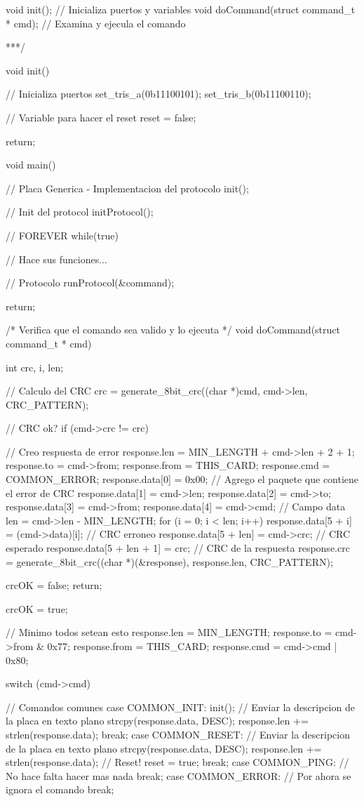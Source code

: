 \documentclass[a4paper,10pt]{article}
\begin{document}
{\begin{verbatimtab}
void init(); // Inicializa puertos y variables
void doCommand(struct command_t * cmd); // Examina y ejecula el comando

***/

void init()
{
	// Inicializa puertos
	set_tris_a(0b11100101);
	set_tris_b(0b11100110);

	// Variable para hacer el reset
	reset = false;

	return;	
}	

void main()
{
	// Placa Generica - Implementacion del protocolo
	init();

	// Init del protocol
	initProtocol();

	// FOREVER
	while(true)
	{
		// Hace sus funciones...

		// Protocolo
		runProtocol(&command);
	}

	return;
}

/* Verifica que el comando sea valido y lo ejecuta */
void doCommand(struct command_t * cmd)
{
	int crc, i, len;
		
	// Calculo del CRC
	crc = generate_8bit_crc((char *)cmd, cmd->len, CRC_PATTERN);
	
	// CRC ok?
	if (cmd->crc != crc)
	{		
		// Creo respuesta de error
		response.len = MIN_LENGTH + cmd->len + 2 + 1;
		response.to = cmd->from;
		response.from = THIS_CARD;
		response.cmd = COMMON_ERROR;
		response.data[0] = 0x00;
		// Agrego el paquete que contiene el error de CRC
		response.data[1] = cmd->len;
		response.data[2] = cmd->to;
		response.data[3] = cmd->from;
		response.data[4] = cmd->cmd;
		// Campo data
		len = cmd->len - MIN_LENGTH;
		for (i = 0; i < len; i++)
			response.data[5 + i] = (cmd->data)[i];
		// CRC erroneo
		response.data[5 + len] = cmd->crc;
		// CRC esperado
		response.data[5 + len + 1] = crc;
		// CRC de la respuesta
		response.crc = generate_8bit_crc((char *)(&response), response.len, CRC_PATTERN);
	
		crcOK = false;
		return;
	}

	crcOK = true;
	
	// Minimo todos setean esto
	response.len = MIN_LENGTH;
	response.to = cmd->from & 0x77;
	response.from = THIS_CARD;
	response.cmd = cmd->cmd | 0x80;

	switch (cmd->cmd)
	{
		// Comandos comunes
		case COMMON_INIT: 
			init();
			// Enviar la descripcion de la placa en texto plano
			strcpy(response.data, DESC);
			response.len += strlen(response.data);
		break;
		case COMMON_RESET: 
			// Enviar la descripcion de la placa en texto plano
			strcpy(response.data, DESC);
			response.len += strlen(response.data);
			// Reset!
			reset = true;
		break;
		case COMMON_PING: 
			// No hace falta hacer mas nada
		break;
 		case COMMON_ERROR:
			// Por ahora se ignora el comando
		break;
		
}}
\end{verbatimtab}}
\end{document}
